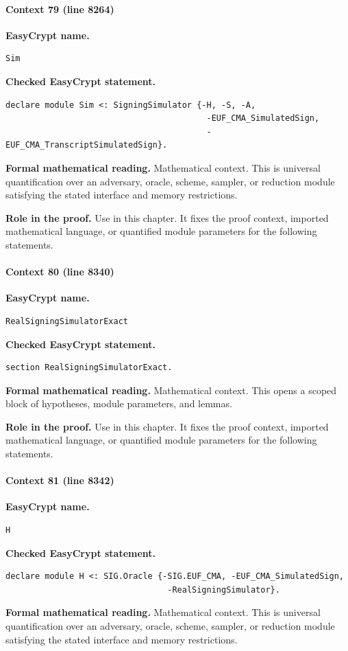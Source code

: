 \paragraph{Context 79 (line 8264)}
\noindent\textbf{EasyCrypt name.}
\begin{lstlisting}[language=EasyCrypt,basicstyle=\ttfamily\scriptsize]
Sim
\end{lstlisting}
\noindent\textbf{Checked EasyCrypt statement.}
\begin{lstlisting}[language=EasyCrypt,basicstyle=\ttfamily\scriptsize]
declare module Sim <: SigningSimulator {-H, -S, -A,
                                         -EUF_CMA_SimulatedSign,
                                         -EUF_CMA_TranscriptSimulatedSign}.
\end{lstlisting}
\noindent\textbf{Formal mathematical reading.}
Mathematical context. This is universal quantification over an adversary, oracle, scheme, sampler, or reduction module satisfying the stated interface and memory restrictions.

\noindent\textbf{Role in the proof.}
Use in this chapter. It fixes the proof context, imported mathematical language, or quantified module parameters for the following statements.

\paragraph{Context 80 (line 8340)}
\noindent\textbf{EasyCrypt name.}
\begin{lstlisting}[language=EasyCrypt,basicstyle=\ttfamily\scriptsize]
RealSigningSimulatorExact
\end{lstlisting}
\noindent\textbf{Checked EasyCrypt statement.}
\begin{lstlisting}[language=EasyCrypt,basicstyle=\ttfamily\scriptsize]
section RealSigningSimulatorExact.
\end{lstlisting}
\noindent\textbf{Formal mathematical reading.}
Mathematical context. This opens a scoped block of hypotheses, module parameters, and lemmas.

\noindent\textbf{Role in the proof.}
Use in this chapter. It fixes the proof context, imported mathematical language, or quantified module parameters for the following statements.

\paragraph{Context 81 (line 8342)}
\noindent\textbf{EasyCrypt name.}
\begin{lstlisting}[language=EasyCrypt,basicstyle=\ttfamily\scriptsize]
H
\end{lstlisting}
\noindent\textbf{Checked EasyCrypt statement.}
\begin{lstlisting}[language=EasyCrypt,basicstyle=\ttfamily\scriptsize]
declare module H <: SIG.Oracle {-SIG.EUF_CMA, -EUF_CMA_SimulatedSign,
                                 -RealSigningSimulator}.
\end{lstlisting}
\noindent\textbf{Formal mathematical reading.}
Mathematical context. This is universal quantification over an adversary, oracle, scheme, sampler, or reduction module satisfying the stated interface and memory restrictions.

